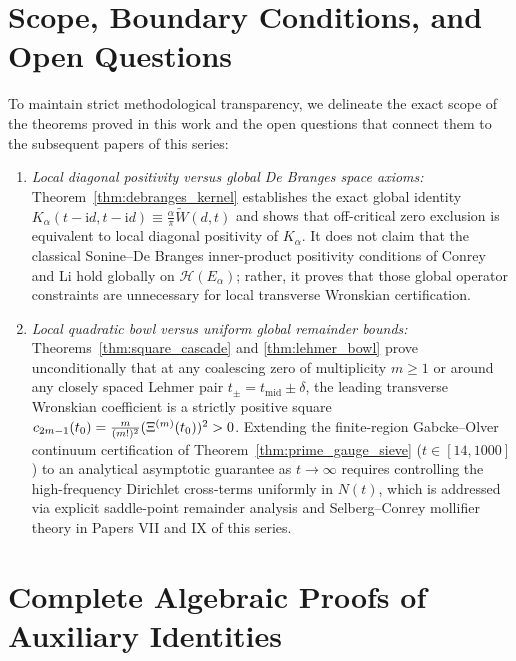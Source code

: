 \documentclass[11pt,reqno,a4paper]{amsart}
\theoremstyle{plain}
\theoremstyle{definition}
\theoremstyle{remark}
\numberwithin{equation}{section}
\newcommand{\fac}{\mathclose{\mathchar"0021}}
\newcommand{\ii}{\mathrm{i}}
\begin{document}
\section{Scope, Boundary Conditions, and Open Questions}\label{sec:scope}

To maintain strict methodological transparency, we delineate the exact scope of the theorems proved in this work and the open questions that connect them to the subsequent papers of this series:
\begin{enumerate}[label=\textbf{\arabic*.},leftmargin=2.2em]
  \item \emph{Local diagonal positivity versus global De Branges space axioms:} Theorem~\ref{thm:debranges_kernel} establishes the exact global identity $K_\alpha(t-\ii d, t-\ii d) \equiv \frac{\alpha}{\pi}\widetilde{W}(d,t)$ and shows that off-critical zero exclusion is equivalent to local diagonal positivity of $K_\alpha$. It does not claim that the classical Sonine--De Branges inner-product positivity conditions of Conrey and Li \cite{ConreyLi2000} hold globally on $\mathcal{H}(E_\alpha)$; rather, it proves that those global operator constraints are unnecessary for local transverse Wronskian certification.
  \item \emph{Local quadratic bowl versus uniform global remainder bounds:} Theorems~\ref{thm:square_cascade} and \ref{thm:lehmer_bowl} prove unconditionally that at any coalescing zero of multiplicity $m \ge 1$ or around any closely spaced Lehmer pair $t_\pm = t_{\mathrm{mid}} \pm \delta$, the leading transverse Wronskian coefficient is a strictly positive square $c_{2m-1}(t_0) = \frac{m}{(m\fac)^2}(\Xi^{(m)}(t_0))^2 > 0$. Extending the finite-region Gabcke--Olver continuum certification of Theorem~\ref{thm:prime_gauge_sieve} ($t \in [14,1000]$) to an analytical asymptotic guarantee as $t \to \infty$ requires controlling the high-frequency Dirichlet cross-terms uniformly in $N(t)$, which is addressed via explicit saddle-point remainder analysis and Selberg--Conrey mollifier theory in Papers VII and IX of this series.
\end{enumerate}

\appendix
\section{Complete Algebraic Proofs of Auxiliary Identities}\label{app:proofs}
\end{document}
